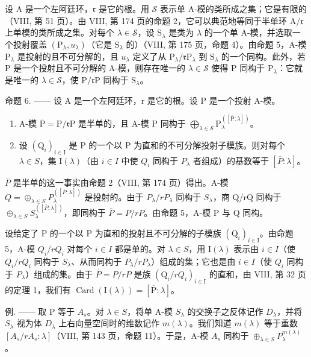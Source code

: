 设 A 是一个左阿廷环，\(\mathfrak{r}\) 是它的根。用 \(\mathcal{S}\) 表示单 A-模的类所成之集；它是有限的（VIII, 第 51 页）。由 VIII, 第 174 页的命题 2，它可以典范地等同于半单环 \(\mathrm{A} / \mathfrak{r}\) 上单模的类所成之集。对每个 \(\lambda \in \mathcal{S}\)，设 \(\mathrm{S}_{\lambda}\) 是类为 \(\lambda\) 的一个单 A-模，并选取一个投射覆盖 \((\mathrm{P}_{\lambda}, u_{\lambda})\)（它是 \(\mathrm{S}_{\lambda}\) 的）（VIII, 第 175 页，命题 4）。由命题 5，A-模 \(\mathrm{P}_{\lambda}\) 是投射的且不可分解的，且 \(u_{\lambda}\) 定义了从 \(\mathrm{P}_{\lambda} / \mathfrak{r}\mathrm{P}_{\lambda}\) 到 \(\mathrm{S}_{\lambda}\) 的一个同构。此外，若 P 是一个投射且不可分解的 A-模，则存在唯一的 \(\lambda \in \mathcal{S}\) 使得 P 同构于 \(\mathrm{P}_{\lambda}\)：它就是唯一的 \(\lambda \in \mathcal{S}\)，使 \(\mathrm{P} / \mathfrak{r}\mathrm{P}\) 同构于 \(\mathrm{S}_{\lambda}\)。

命题 6. —— 设 A 是一个左阿廷环，r 是它的根。设 P 是一个投射 A-模。

\begin{enumerate}
\def\labelenumi{\alph{enumi})}
\item
  A-模 \(\overline{\mathrm{P}} = \mathrm{P} / \mathfrak{r}\mathrm{P}\) 是半单的，且 A-模 \(\mathrm{P}\) 同构于 \(\bigoplus_{\lambda \in \mathcal{S}}\mathrm{P}_{\lambda}^{([\overline{\mathrm{P}}:\lambda ])}\)。
\item
  设 \((\mathrm{Q}_{i})_{i\in\mathrm{I}}\) 是 P 的一个以 P 为直和的不可分解投射子模族。则对每个 \(\lambda\in S\)，集 \(\mathrm{I}(\lambda)\)（由 \(i\in I\) 中使 \(Q_{i}\) 同构于 \(P_{\lambda}\) 者组成）的基数等于 \([\overline{P}:\lambda]\)。
\end{enumerate}

\(\overline{P}\) 是半单的这一事实由命题 2（VIII, 第 174 页）得出。A-模 \(Q = \oplus_{\lambda \in S} P_{\lambda}^{([\overline{P}: \lambda])}\) 是投射的。由于 \(P_{\lambda}/rP_{\lambda}\) 同构于 \(S_{\lambda}\)，商 Q/rQ 同构于 \(\oplus_{\lambda \in S} S_{\lambda}^{([\overline{P}: \lambda])}\)，即同构于 \(\overline{P} = P/rP\)。由命题 5，A-模 P 与 Q 同构。

设给定了 P 的一个以 P 为直和的投射且不可分解的子模族 \((\mathrm{Q}_{i})_{i\in\mathrm{I}}\)。由命题 5，A-模 \(Q_{i}/rQ_{i}\) 对每个 \(i\in I\) 都是单的。对 \(\lambda\in S\)，用 \(\mathrm{I}(\lambda)\) 表示由 \(i\in I\)（使 \(Q_{i}/rQ_{i}\) 同构于 \(S_{\lambda}\)、从而同构于 \(P_{\lambda}/rP_{\lambda}\)）组成的集；它也是由 \(i\in I\)（使 \(Q_{i}\) 同构于 \(P_{\lambda}\)）组成的集。由于 \(\overline{P}=P/rP\) 是族 \((\mathrm{Q}_{i}/rQ_{i})_{i\in\mathrm{I}}\) 的直和，由 VIII, 第 32 页的定理 1，我们有 \(\operatorname{Card}(\mathrm{I}(\lambda))=[\overline{\mathrm{P}}:\lambda]\)。

例. —— 取 P 等于 \(A_{s}\)。对 \(\lambda \in S\)，将单 A-模 \(S_{\lambda}\) 的交换子之反体记作 \(D_{\lambda}\)，并将 \(S_{\lambda}\) 视为体 \(D_{\lambda}\) 上右向量空间时的维数记作 \(m(\lambda)\)。我们知道 \(m(\lambda)\) 等于重数 \([A_{s}/rA_{s} : \lambda]\)（VIII, 第 143 页，命题 11）。于是，A-模 \(A_{s}\) 同构于 \(\oplus_{\lambda \in S} P_{\lambda}^{m(\lambda)}\)。

